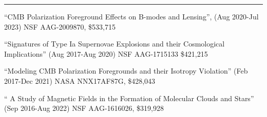 
\vspace{0.3in}
\rule[3pt]{417pt}{.1mm}

\medskip
\noindent
``CMB Polarization Foreground Effects on B-modes and Lensing'', (Aug 2020-Jul
2023) NSF AAG-2009870,  \$533,715

\medskip
\noindent
``Signatures of Type Ia Supernovae Explosions and their Cosmological
Implications'' (Aug 2017-Aug 2020) NSF AAG-1715133 \$421,215

\medskip
\noindent
``Modeling CMB Polarization Foregrounds and their Isotropy Violation'' (Feb
2017-Dec 2021) NASA NNX17AF87G, \$428,043

\medskip
\noindent
`` A Study of Magnetic Fields in the Formation of Molecular Clouds and Stars''
(Sep 2016-Aug 2022) NSF AAG-1616026, \$319,928


